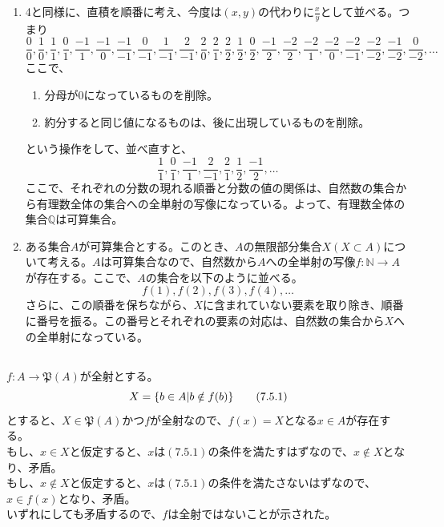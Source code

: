 \documentclass{jsarticle}
\begin{document}
\begin{enumerate}
\item
4と同様に、直積を順番に考え、今度は$(x,y)$の代わりに$\frac{x}{y}$として並べる。つまり\\
\[\frac{0}{0},\frac{1}{0},\frac{1}{1},\frac{0}{1},\frac{-1}{1},\frac{-1}{0},\frac{-1}{-1},\frac{0}{-1},
\frac{1}{-1},\frac{2}{-1},\frac{2}{0},\frac{2}{1},\frac{2}{2},\frac{1}{2},\frac{0}{2},\frac{-1}{2},\frac{-2}{2},\frac{-2}{1},\frac{-2}{0},\frac{-2}{-1},\frac{-2}{-2},\frac{-1}{-2},\frac{0}{-2},\dots\]
ここで、
\begin{enumerate}
\item 分母が0になっているものを削除。
\item 約分すると同じ値になるものは、後に出現しているものを削除。
\end{enumerate}
という操作をして、並べ直すと、
\[\frac{1}{1},\frac{0}{1},\frac{-1}{1},\frac{2}{-1},\frac{2}{1},\frac{1}{2},\frac{-1}{2},\dots\]
ここで、それぞれの分数の現れる順番と分数の値の関係は、自然数の集合から有理数全体の集合への全単射の写像になっている。よって、有理数全体の集合$\mathbb{Q}$は可算集合。
\item
ある集合$A$が可算集合とする。このとき、$A$の無限部分集合$X(X\subset A)$について考える。$A$は可算集合なので、自然数から$A$への全単射の写像$f:\mathbb{N}\to A$が存在する。ここで、$A$の集合を以下のように並べる。
\[f(1),f(2),f(3),f(4),\dots\]
さらに、この順番を保ちながら、$X$に含まれていない要素を取り除き、順番に番号を振る。この番号とそれぞれの要素の対応は、自然数の集合から$X$への全単射になっている。
\end{enumerate}

\subsection{}
$f:A\to\mathfrak{P}(A)$が全射とする。
\begin{equation}
X=\{b\in A|b\notin f(b)\} \tag{7.5.1}\\
\end{equation}
とすると、$X\in\mathfrak{P}(A)$かつ$f$が全射なので、$f(x)=X$となる$x\in A$が存在する。\\
もし、$x\in X$と仮定すると、$x$は$(7.5.1)$の条件を満たすはずなので、$x\notin X$となり、矛盾。\\
もし、$x\notin X$と仮定すると、$x$は$(7.5.1)$の条件を満たさないはずなので、$x\in f(x)$となり、矛盾。\\
いずれにしても矛盾するので、$f$は全射ではないことが示された。


\end{document}
